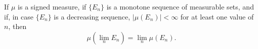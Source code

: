 If $\mu$ is a signed measure, if $\{E_n\}$ is a monotone sequence of measurable sets, and if, in case $\{E_n\}$ is a decreasing sequence, $|\mu(E_n)| < \infty$ for at least one value of $n$, then
$$\mu(\lim_n E_n) = \lim_n \mu(E_n).$$
